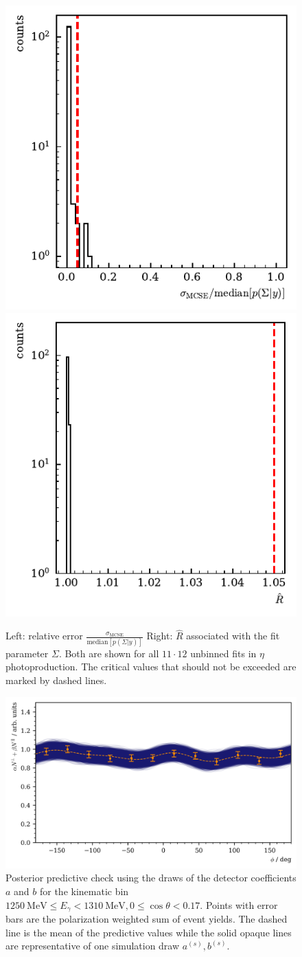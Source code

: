  \begin{figure}[htbp]
	\includegraphics[width=.49\linewidth]{../bayes/event_based_fit/plots/mcse_hist.pdf}
	\includegraphics[width=.49\linewidth]{../bayes/event_based_fit/plots/rhat_hist.pdf}
	\caption{ Left: relative error $\frac{\sigma_\text{MCSE}}{\text{median}\left[p\left(\Sigma|y\right)\right]}$ Right: $\widehat{R}$ associated with the fit parameter $\Sigma$. Both are shown for all $11\cdot12$ unbinned fits in $\eta$ photoproduction. The critical values that should not be exceeded are marked by dashed lines.}
	\label{fig:diagnostics1}
\end{figure}
\begin{figure}[htbp]
	\centering
	\includegraphics[width=\linewidth]{../bayes/event_based_fit/plots/eff_PPC.png}
	\caption{Posterior predictive check using the draws of the detector coefficients $a$ and $b$ for the kinematic bin $\SI{1250}{\mega\eV}\leq E_\gamma<\SI{1310}{\mega\eV}, 0\leq\cos\theta<0.17$. Points with error bars are the polarization weighted sum of event yields. The dashed line is the mean of the predictive values while the solid opaque lines are representative of one simulation draw $a^{(s)},b^{(s)}$.}
	\label{fig:eff_func}
\end{figure}

